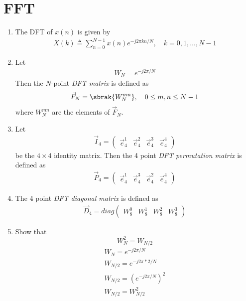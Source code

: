 \documentclass[journal,12pt,twocolumn]{IEEEtran}
\newcommand{\myvec}[1]{\ensuremath{\begin{pmatrix}#1\end{pmatrix}}}
\renewcommand\thesection{\arabic{section}}
\begin{document}
\section{FFT}
\begin{enumerate}[label=\thesection.\arabic*]
    \item The DFT of $x(n)$ is given by
    \begin{align}
        X(k) \triangleq \sum_{n=0}^{N-1} x(n) e^{-j 2 \pi k n / N}, \quad k=0,1, \ldots, N-1
    \end{align}
\item Let 
	\begin{align}
W_{N} = e^{-j2\pi/N} 
	\end{align}
		Then the $N$-point {\em DFT matrix} is defined as 
	\begin{align}
		\vec{F}_{N} = \sbrak{W_{N}^{mn}}, \quad 0 \le m,n \le N-1 
	\end{align}
	where $W_{N}^{mn}$ are the elements of $\vec{F}_{N}$.
\item Let 
	\begin{align}
		\vec{I}_4 = \myvec{\vec{e}_4^{1} &\vec{e}_4^{2} &\vec{e}_4^{3} &\vec{e}_4^{4} }
	\end{align}
		be the $4\times 4$ identity matrix.  Then the 4 point {\em DFT permutation matrix} is defined as 
	\begin{align}
		\vec{P}_4 = \myvec{\vec{e}_4^{1} &\vec{e}_4^{3} &\vec{e}_4^{2} &\vec{e}_4^{4} }
	\end{align}
\item The 4 point {\em DFT diagonal matrix} is defined as 
	\begin{align}
		\vec{D}_4 = diag\myvec{W_{8}^{0} & W_{8}^{1} & W_{8}^{2} & W_{8}^{3}}
	\end{align}
\item Show that 
\begin{equation}
    W_{N}^{2}=W_{N/2}
\label{eq:n-2}
\end{equation}
\solution
\begin{align}
     W_{N} = e^{-j2\pi/N}  \\
     W_{N/2} = e^{-j2\pi*2/N} \\
     W_{N/2} = \left(e^{-j2\pi/N}\right)^2 \\
     W_{N/2} = W_{N/2}^2 \\

\end{align}
\end{enumerate}
\end{document}
